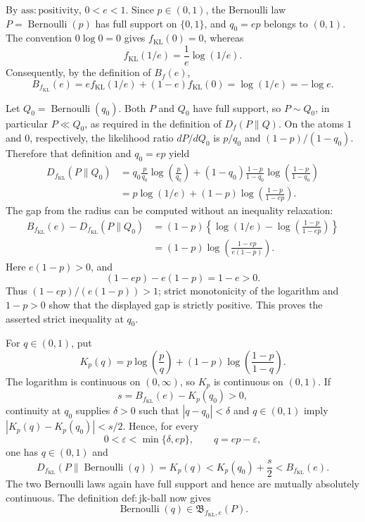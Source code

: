 By \(\mathrm{ass{:}positivity}\), \(0<e<1\).  Since \(p\in(0,1)\), the Bernoulli law \(P=\operatorname{Bernoulli}(p)\) has full support on \(\{0,1\}\), and \(q_0=ep\) belongs to \((0,1)\).  The convention \(0\log 0=0\) gives \(f_{\mathrm{KL}}(0)=0\), whereas
\[
 f_{\mathrm{KL}}(1/e)=\frac1e\log(1/e).
\]
Consequently, by the definition of \(B_f(e)\),
\[
 B_{f_{\mathrm{KL}}}(e)
 =e f_{\mathrm{KL}}(1/e)+(1-e)f_{\mathrm{KL}}(0)
 =\log(1/e)=-\log e.
\]

Let \(Q_0=\operatorname{Bernoulli}(q_0)\).  Both \(P\) and \(Q_0\) have full support, so \(P\sim Q_0\), in particular \(P\ll Q_0\), as required in the definition of \(D_f(P\|Q)\).  On the atoms \(1\) and \(0\), respectively, the likelihood ratio \(dP/dQ_0\) is \(p/q_0\) and \((1-p)/(1-q_0)\).  Therefore that definition and \(q_0=ep\) yield
\[
\begin{aligned}
 D_{f_{\mathrm{KL}}}(P\|Q_0)
 &=q_0\frac{p}{q_0}\log\!\left(\frac{p}{q_0}\right)
   +(1-q_0)\frac{1-p}{1-q_0}
       \log\!\left(\frac{1-p}{1-q_0}\right)\\
 &=p\log(1/e)+(1-p)\log\!\left(\frac{1-p}{1-ep}\right).
\end{aligned}
\]
The gap from the radius can be computed without an inequality relaxation:
\[
\begin{aligned}
 B_{f_{\mathrm{KL}}}(e)-D_{f_{\mathrm{KL}}}(P\|Q_0)
 &=(1-p)\left\{\log(1/e)-
       \log\!\left(\frac{1-p}{1-ep}\right)\right\}\\
 &=(1-p)\log\!\left(\frac{1-ep}{e(1-p)}\right).
\end{aligned}
\]
Here \(e(1-p)>0\), and
\[
 (1-ep)-e(1-p)=1-e>0.
\]
Thus \((1-ep)/(e(1-p))>1\); strict monotonicity of the logarithm and \(1-p>0\) show that the displayed gap is strictly positive.  This proves the asserted strict inequality at \(q_0\).

For \(q\in(0,1)\), put
\[
 K_p(q)=p\log\!\left(\frac p q\right)
       +(1-p)\log\!\left(\frac{1-p}{1-q}\right).
\]
The logarithm is continuous on \((0,\infty)\), so \(K_p\) is continuous on \((0,1)\).  If
\[
 s=B_{f_{\mathrm{KL}}}(e)-K_p(q_0)>0,
\]
continuity at \(q_0\) supplies \(\delta>0\) such that \(|q-q_0|<\delta\) and \(q\in(0,1)\) imply \(|K_p(q)-K_p(q_0)|<s/2\).  Hence, for every
\[
 0<\varepsilon<\min\{\delta,ep\},
 \qquad q=ep-\varepsilon,
\]
one has \(q\in(0,1)\) and
\[
 D_{f_{\mathrm{KL}}}\!\left(P\middle\|\operatorname{Bernoulli}(q)\right)
 =K_p(q)<K_p(q_0)+\frac{s}{2}<B_{f_{\mathrm{KL}}}(e).
\]
The two Bernoulli laws again have full support and hence are mutually absolutely continuous.  The definition \(\mathrm{def{:}jk\text{-}ball}\) now gives
\[
 \operatorname{Bernoulli}(q)\in\mathfrak B_{f_{\mathrm{KL}},e}(P).
\]

